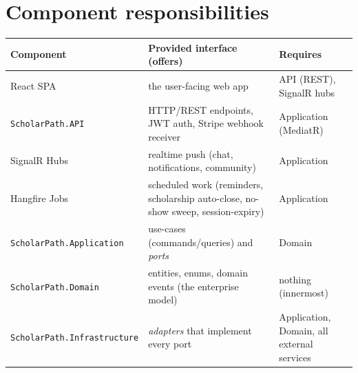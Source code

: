 \documentclass[11pt,a4paper]{article}
\begin{document}
\section{Component responsibilities}
\begin{longtable}{@{}p{3.5cm}p{6.4cm}p{4.3cm}@{}}
\toprule
\textbf{Component} & \textbf{Provided interface (offers)} & \textbf{Requires}\\
\midrule\endhead
React SPA & the user-facing web app & API (REST), SignalR hubs\\
\texttt{ScholarPath.API} & HTTP/REST endpoints, JWT auth, Stripe webhook receiver & Application (MediatR)\\
SignalR Hubs & realtime push (chat, notifications, community) & Application\\
Hangfire Jobs & scheduled work (reminders, scholarship auto-close, no-show sweep, session-expiry) & Application\\
\texttt{ScholarPath.Application} & use-cases (commands/queries) and \emph{ports} & Domain\\
\texttt{ScholarPath.Domain} & entities, enums, domain events (the enterprise model) & nothing (innermost)\\
\texttt{ScholarPath.Infrastructure} & \emph{adapters} that implement every port & Application, Domain, all external services\\
\bottomrule
\end{longtable}
\end{document}
